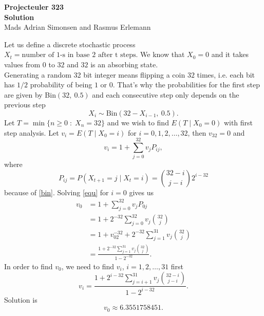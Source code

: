 \documentclass[12pt,a4paper]{article}
\theoremstyle{definition}
\theoremstyle{plain}
\begin{document}
	\begin{center}
		\LARGE \textbf{Projecteuler 323}\\
		\large \textbf{Solution}\\
		\normalsize Mads Adrian Simonsen and Rasmus Erlemann
		\end{center}
	\vspace{0.5cm}
	Let us define a discrete stochastic process $X_t= \text{number of }1\text{-s in base }2\text{ after t steps}$. We know that $X_0=0$ and it takes values from $0$ to $32$ and $32$ is an absorbing state. \\
	Generating a random 32 bit integer means flipping a coin $32$ times, i.e. each bit has $1/2$ probability of being $1$ or $0$. That's why the probabilities for the first step are given by Bin$(32,\ 0.5)$ and each consecutive step only depends on the previous step
	\begin{equation}\label{bin}X_i\sim \text{Bin}(32-X_{i-1}, \ 0.5).\end{equation}
	Let $T=\min\{n\geq 0 \; \colon \; X_n=32\}$ and we wish to find $E(T\; | \; X_0=0)$ with first step analysis. Let $v_i=E(T\; | \; X_0=i)$ for $i=0,1,2,\ldots ,32$, then $v_{32}=0$ and
	\begin{equation}\label{equ}v_i=1+\sum_{j=0}^{32}v_jP_{ij},\end{equation}
	where 
	$$P_{ij}=P(X_{t+1}=j\; | \; X_t=i)=\binom{32-i}{j-i}2^{i-32}$$
	because of \eqref{bin}. Solving \eqref{equ} for $i=0$ gives us 
	\begin{align*}v_0&= 1+\sum_{j=0}^{32}v_jP_{0j}\\
	&=1+2^{-32}\sum_{j=0}^{32}v_j\binom{32}{j}\\
	&=1+v_02^{-32}+2^{-32}\sum_{j=1}^{31}v_j\binom{32}{j}\\
	&=\frac{1+2^{-32}\sum_{j=1}^{31}v_j\binom{32}{j}}{1-2^{-32}}.
	\end{align*}
	In order to find $v_0$, we need to find $v_i$, $i=1,2,\ldots ,31$ first
	$$v_i=\frac{1+2^{i-32}\sum_{j=i+1}^{31}v_j\binom{32-i}{j-i}}{1-2^{i-32}}.$$
	Solution is
	$$v_0\approx 6.3551758451.$$
	\thispagestyle{empty}
\end{document}
